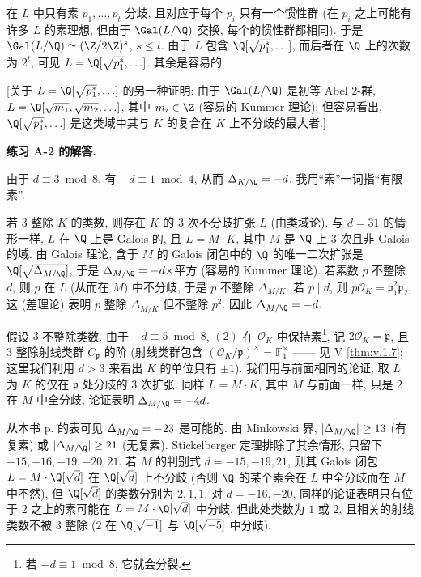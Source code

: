 在 $L$ 中只有素 $p_1,\ldots,p_t$ 分歧, 且对应于每个 $p_i$ 只有一个惯性群 (在 $p_i$ 之上可能有许多 $L$ 的素理想, 但由于 $\Gal(L/\Q)$ 交换, 每个的惯性群都相同). 于是 $\Gal(L/\Q)\simeq(\Z/2\Z)^{s}$, $s\le t$. 由于 $L$ 包含 $\Q[\sqrt{p_1^{*}},\ldots]$, 而后者在 $\Q$ 上的次数为 $2^{t}$, 可见 $L=\Q[\sqrt{p_1^{*}},\ldots]$. 其余是容易的.

[关于 $L=\Q[\sqrt{p_1^{*}},\ldots]$ 的另一种证明: 由于 $\Gal(L/\Q)$ 是初等 Abel $2$-群, $L=\Q[\sqrt{m_1},\sqrt{m_2},\ldots]$, 其中 $m_i\in\Z$ (容易的 Kummer 理论); 但容易看出, $\Q[\sqrt{p_1^{*}},\ldots]$ 是这类域中其与 $K$ 的复合在 $K$ 上不分歧的最大者.]

\noindent\textbf{练习 A-2 的解答.}

由于 $d\equiv 3 \bmod 8$, 有 $-d\equiv 1 \bmod 4$, 从而 $\Delta_{K/\Q}=-d$. 我用``素''一词指``有限素''.

若 $3$ 整除 $K$ 的类数, 则存在 $K$ 的 $3$ 次不分歧扩张 $L$ (由类域论). 与 $d=31$ 的情形一样, $L$ 在 $\Q$ 上是 Galois 的, 且 $L=M\cdot K$, 其中 $M$ 是 $\Q$ 上 $3$ 次且非 Galois 的域. 由 Galois 理论, 含于 $M$ 的 Galois 闭包中的 $\Q$ 的唯一二次扩张是 $\Q[\sqrt{\Delta_{M/\Q}}]$, 于是 $\Delta_{M/\Q}=-d\times$平方 (容易的 Kummer 理论). 若素数 $p$ 不整除 $d$, 则 $p$ 在 $L$ (从而在 $M$) 中不分歧, 于是 $p$ 不整除 $\Delta_{M/K}$. 若 $p\mid d$, 则 $p\mathcal{O}_K=\mathfrak{p}_1^{2}\mathfrak{p}_2$, 这 (差理论) 表明 $p$ 整除 $\Delta_{M/K}$ 但不整除 $p^{2}$. 因此 $\Delta_{M/\Q}=-d$.

假设 $3$ 不整除类数. 由于 $-d\equiv 5 \bmod 8$, $(2)$ 在 $\mathcal{O}_K$ 中保持素\footnote{若 $-d\equiv 1 \bmod 8$, 它就会分裂.}, 记 $2\mathcal{O}_K=\mathfrak{p}$, 且 $3$ 整除射线类群 $C_{\mathfrak{p}}$ 的阶 (射线类群包含 $(\mathcal{O}_K/\mathfrak{p})^{\times}=\mathbb{F}_4^{\times}$ —— 见 V \ref{thm:v.1.7}; 这里我们利用 $d>3$ 来看出 $K$ 的单位只有 $\pm1$). 我们用与前面相同的论证, 取 $L$ 为 $K$ 的仅在 $\mathfrak{p}$ 处分歧的 $3$ 次扩张. 同样 $L=M\cdot K$, 其中 $M$ 与前面一样, 只是 $2$ 在 $M$ 中全分歧, 论证表明 $\Delta_{M/\Q}=-4d$.

从本书 p.\pageref{exc:v.3.14} 的表可见 $\Delta_{M/\Q}=-23$ 是可能的. 由 Minkowski 界, $|\Delta_{M/\Q}|\ge 13$ (有复素) 或 $|\Delta_{M/\Q}|\ge 21$ (无复素). Stickelberger 定理排除了其余情形, 只留下 $-15,-16,-19,-20,21$. 若 $M$ 的判别式 $d=-15,-19,21$, 则其 Galois 闭包 $L=M\cdot\Q[\sqrt{d}]$ 在 $\Q[\sqrt{d}]$ 上不分歧 (否则 $\Q$ 的某个素会在 $L$ 中全分歧而在 $M$ 中不然), 但 $\Q[\sqrt{d}]$ 的类数分别为 $2,1,1$. 对 $d=-16,-20$, 同样的论证表明只有位于 $2$ 之上的素可能在 $L=M\cdot\Q[\sqrt{d}]$ 中分歧, 但此处类数为 $1$ 或 $2$, 且相关的射线类数不被 $3$ 整除 ($2$ 在 $\Q[\sqrt{-1}]$ 与 $\Q[\sqrt{-5}]$ 中分歧).


